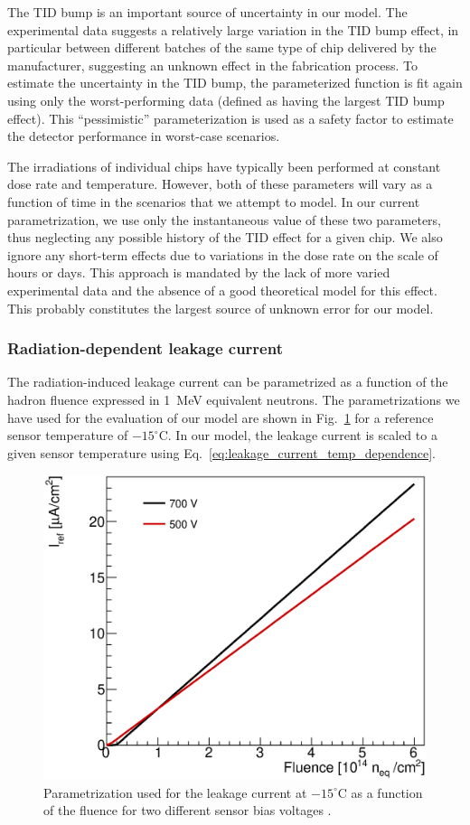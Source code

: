 The TID bump is an important source of uncertainty in our model. The experimental data suggests
a relatively large variation in the TID bump effect, in particular
between different batches of the same type of chip delivered by the manufacturer, suggesting an unknown
effect in the fabrication process. To estimate the uncertainty in the TID bump,
the parameterized function is fit again using only the worst-performing data (defined as having the
largest TID bump effect). This ``pessimistic'' parameterization is used as a safety factor to estimate
the detector performance in worst-case scenarios.

The irradiations of individual chips have typically been performed at constant dose rate and temperature.
However, both of these parameters will vary as a function of time in the scenarios that we attempt to model.
In our current parametrization, we use only the instantaneous value of these two parameters, thus neglecting any possible history of the TID effect for a given chip. We also ignore any short-term effects due to variations in the dose rate on the scale of hours or days. This approach is mandated by the lack of more varied experimental data and the absence of a good theoretical model for this effect. This probably constitutes the largest source of unknown error for our model.

\subsubsection{Radiation-dependent leakage current}

The radiation-induced leakage current can be parametrized as a function of the hadron fluence expressed in 1~MeV equivalent neutrons. The parametrizations we have used for the evaluation of our model are shown in Fig.~\ref{fig:leakage} for a reference sensor temperature of $-15^\circ$C. In our model, the leakage current is scaled to a given sensor temperature using Eq.~\ref{eq:leakage_current_temp_dependence}.

\begin{figure}[ht]
\centering
\includegraphics[width=0.45\linewidth]{figures/SensorLeakagePower.eps}
\caption{Parametrization used for the leakage current at $-15^\circ$C as a function of the fluence for two different sensor bias voltages \cite{mikestikova}.}
\label{fig:leakage}
\end{figure}
